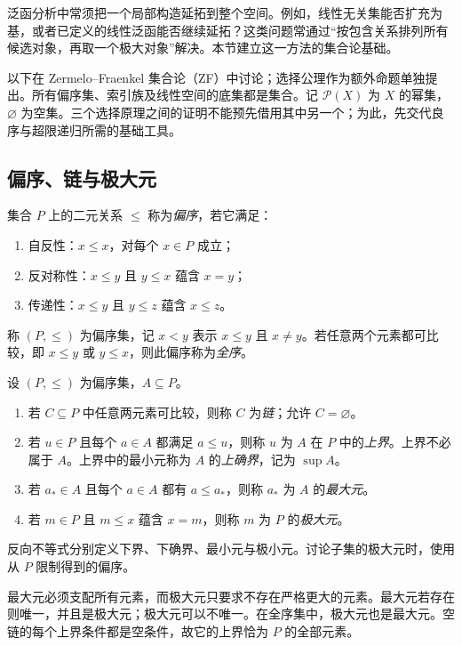 泛函分析中常须把一个局部构造延拓到整个空间。例如，线性无关集能否扩充为基，或者已定义的线性泛函能否继续延拓？这类问题常通过“按包含关系排列所有候选对象，再取一个极大对象”解决。本节建立这一方法的集合论基础。

以下在 Zermelo--Fraenkel 集合论（ZF）中讨论；选择公理作为额外命题单独提出。所有偏序集、索引族及线性空间的底集都是集合。记 $\mathcal P(X)$ 为 $X$ 的幂集，$\varnothing$ 为空集。三个选择原理之间的证明不能预先借用其中另一个；为此，先交代良序与超限递归所需的基础工具。

\subsection{偏序、链与极大元}
\begin{definition}[偏序与全序]\label{def:y0-partial-order}
集合 $P$ 上的二元关系 $\le$ 称为\emph{偏序}，若它满足：
\begin{enumerate}
  \item 自反性：$x\le x$，对每个 $x\in P$ 成立；
  \item 反对称性：$x\le y$ 且 $y\le x$ 蕴含 $x=y$；
  \item 传递性：$x\le y$ 且 $y\le z$ 蕴含 $x\le z$。
\end{enumerate}
称 $(P,\le)$ 为偏序集，记 $x<y$ 表示 $x\le y$ 且 $x\ne y$。若任意两个元素都可比较，即 $x\le y$ 或 $y\le x$，则此偏序称为\emph{全序}。
\end{definition}

\begin{definition}[链、上界、最大元与极大元]\label{def:y0-chain}
设 $(P,\le)$ 为偏序集，$A\subseteq P$。
\begin{enumerate}
  \item 若 $C\subseteq P$ 中任意两元素可比较，则称 $C$ 为\emph{链}；允许 $C=\varnothing$。
  \item 若 $u\in P$ 且每个 $a\in A$ 都满足 $a\le u$，则称 $u$ 为 $A$ 在 $P$ 中的\emph{上界}。上界不必属于 $A$。上界中的最小元称为 $A$ 的\emph{上确界}，记为 $\sup A$。
  \item 若 $a_*\in A$ 且每个 $a\in A$ 都有 $a\le a_*$，则称 $a_*$ 为 $A$ 的\emph{最大元}。
  \item 若 $m\in P$ 且 $m\le x$ 蕴含 $x=m$，则称 $m$ 为 $P$ 的\emph{极大元}。
\end{enumerate}
反向不等式分别定义下界、下确界、最小元与极小元。讨论子集的极大元时，使用从 $P$ 限制得到的偏序。
\end{definition}

最大元必须支配所有元素，而极大元只要求不存在严格更大的元素。最大元若存在则唯一，并且是极大元；极大元可以不唯一。在全序集中，极大元也是最大元。空链的每个上界条件都是空条件，故它的上界恰为 $P$ 的全部元素。

